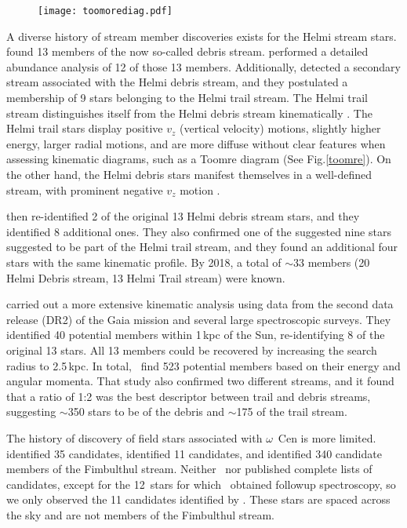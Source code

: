 \documentclass[twocolumn]{aastex63}
\begin{document}
\begin{figure}[!ht]
  \texttt{[image: toomorediag.pdf]} 
\end{figure}

A diverse history of stream member discoveries exists for the Helmi stream stars.
\citet{Helmi99a} found 13 members of the now so-called debris stream. 
\citet{Roederer10} performed a detailed abundance analysis of 12 of those 13 members. Additionally, \citet{chiba00} detected a secondary stream associated with the Helmi debris stream, and they postulated a membership of 9 stars belonging to the Helmi trail stream. The Helmi trail stream distinguishes itself from the Helmi debris stream kinematically \citep{yuan20}. The Helmi trail stars display positive $v_z$ (vertical velocity) motions, slightly higher energy, larger radial motions, and are more diffuse without clear features when assessing kinematic diagrams, such as a Toomre diagram (See Fig.\ref{toomre}). On the other hand, the Helmi debris stars manifest themselves in a well-defined stream, with prominent negative $v_z$ motion \citep{myeong19}.

\citet{beers17} then re-identified 2 of the original 13 Helmi debris stream stars, and they identified 8 additional ones. They also confirmed one of the suggested nine stars suggested to be part of the Helmi trail stream, and they found an additional four stars with the same kinematic profile. By 2018, a total of $\sim$33 members (20 Helmi Debris stream, 13 Helmi Trail stream) were known. 

\citet{koppelman19} carried out a more extensive kinematic analysis using data from the second data release (DR2) of the Gaia mission and several large spectroscopic surveys. They
identified 40 potential members within 1\,kpc of the Sun, re-identifying 8 of the original 13 stars. All 13 members could be recovered by increasing the search radius to 2.5\,kpc. In total, \citeauthor{koppelman19}\ find 523 potential members based on their energy and angular momenta. That study also confirmed two different streams, and it found that a ratio of 1:2 was the best descriptor between trail and debris streams, suggesting $\sim$350 stars to be of the debris and $\sim$175 of the trail stream.

The history of discovery of field stars associated with $\omega$~Cen is more limited.
\citet{majewski12} identified 35 candidates,
\citet{beers17} identified 11 candidates, and \citet{ibata19a} identified 340 candidate members of the Fimbulthul stream.
Neither \citeauthor{majewski12}\ nor \citeauthor{ibata19a} published complete lists of candidates, except for the 12~stars for which \citeauthor{majewski12}\ obtained followup spectroscopy, so we only observed the 11 candidates identified by \citeauthor{beers17}.
These stars are spaced across the sky and are not members of the Fimbulthul stream.
\end{document}
